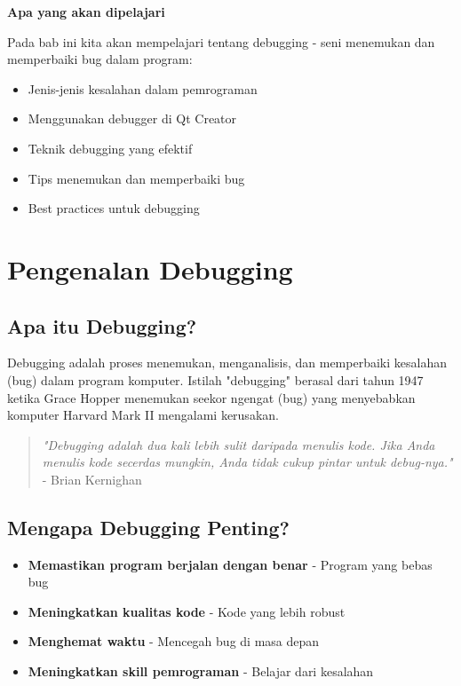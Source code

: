 \textbf{Apa yang akan dipelajari}

Pada bab ini kita akan mempelajari tentang debugging - seni menemukan dan memperbaiki bug dalam program:

\begin{itemize}
\item Jenis-jenis kesalahan dalam pemrograman
\item Menggunakan debugger di Qt Creator
\item Teknik debugging yang efektif
\item Tips menemukan dan memperbaiki bug
\item Best practices untuk debugging
\end{itemize}

\minitoc

\section{Pengenalan Debugging}

\subsection{Apa itu Debugging?}

Debugging adalah proses menemukan, menganalisis, dan memperbaiki kesalahan (bug) dalam program komputer. Istilah "debugging" berasal dari tahun 1947 ketika Grace Hopper menemukan seekor ngengat (bug) yang menyebabkan komputer Harvard Mark II mengalami kerusakan.

\begin{quote}
\textit{"Debugging adalah dua kali lebih sulit daripada menulis kode. Jika Anda menulis kode secerdas mungkin, Anda tidak cukup pintar untuk debug-nya."} - Brian Kernighan
\end{quote}

\subsection{Mengapa Debugging Penting?}

\begin{itemize}
\item \textbf{Memastikan program berjalan dengan benar} - Program yang bebas bug
\item \textbf{Meningkatkan kualitas kode} - Kode yang lebih robust
\item \textbf{Menghemat waktu} - Mencegah bug di masa depan
\item \textbf{Meningkatkan skill pemrograman} - Belajar dari kesalahan
\end{itemize}

